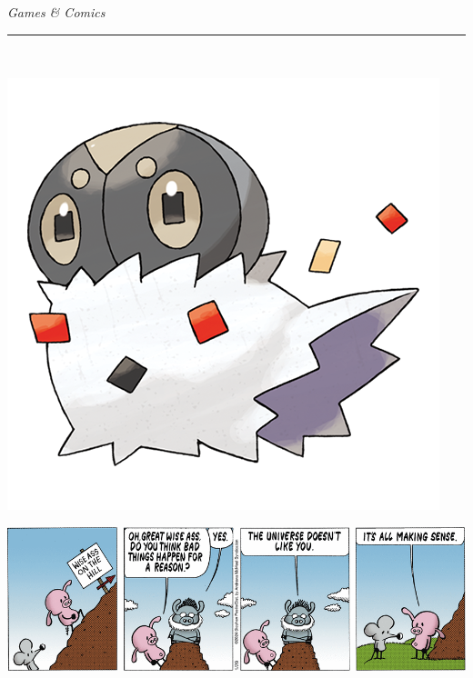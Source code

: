 \documentclass[landscape]{article}
\renewcommand\headline[1]{\begin{center} {\huge \textsl{ #1}}\\ %
			\rule[5pt]{0.8\hsize}{0.5pt}\\ \end{center}}
\begin{document}
\begin{multicols}{3}
\begin{minipage}{0.1\linewidth}
\end{minipage}
\begin{minipage}{0.9\linewidth}
	
\end{minipage}

\headline{Games \& Comics}
\vspace{-0.4cm}

\noindent\begin{minipage}{0.3\linewidth}
\noindent\includegraphics[width=\linewidth]{images/pokedex.png}
\end{minipage}
\begin{minipage}{0.74\linewidth}

\end{minipage}

\center\includegraphics[width=\linewidth]{images/comic-pearls.png}


\end{multicols}
\end{document}
